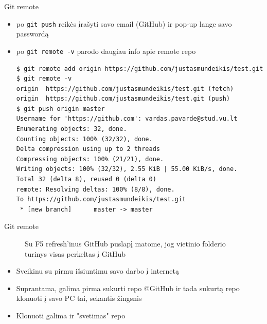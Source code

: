 \documentclass[11pt,xcolor=table]{beamer}
\begin{document}

\begin{frame}[fragile]{Git remote}
\begin{itemize}
\item po \colorbox{listinggray}{\lstinline|git push|} reikės įrašyti savo email (GitHub) ir pop-up lange savo passwordą
\item po \colorbox{listinggray}{\lstinline|git remote -v|} parodo daugiau info apie remote repo
\begin{lstlisting}
$ git remote add origin https://github.com/justasmundeikis/test.git
$ git remote -v
origin  https://github.com/justasmundeikis/test.git (fetch)
origin  https://github.com/justasmundeikis/test.git (push)
$ git push origin master
Username for 'https://github.com': vardas.pavarde@stud.vu.lt
Enumerating objects: 32, done.
Counting objects: 100% (32/32), done.
Delta compression using up to 2 threads
Compressing objects: 100% (21/21), done.
Writing objects: 100% (32/32), 2.55 KiB | 55.00 KiB/s, done.
Total 32 (delta 8), reused 0 (delta 0)
remote: Resolving deltas: 100% (8/8), done.
To https://github.com/justasmundeikis/test.git
 * [new branch]      master -> master
\end{lstlisting}
\end{itemize}
\end{frame}



\begin{frame}[fragile]{Git remote}
\begin{figure}
\caption{Su F5 refresh'inus GitHub puslapį matome, jog vietinio folderio turinys visas perkeltas į GitHub}
\end{figure}
\end{frame}


\begin{frame}
\begin{itemize}
\item Sveikinu su pirmu išsiuntimu savo darbo į internetą
\item Suprantama, galima pirma sukurti repo @GitHub ir tada sukurtą repo klonuoti į savo PC tai, sekantis žingsnis
\item Klonuoti galima ir "svetimas" repo
\end{itemize}
\end{frame}
\end{document}
